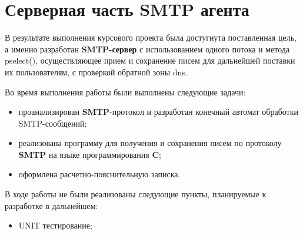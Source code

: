 \documentclass[a4paper,12pt]{report}
\begin{document}
\section{Серверная часть SMTP агента}

В результате выполнения курсового проекта была достугнута поставленная цель, а именно разработан
\textbf{SMTP-сервер} с использованием одного потока и метода pselect(), осуществляющее прием и сохранение писем
для дальнейшей поставки их пользователям, с проверкой обратной зоны dns.

Во время выполнения работы были выполнены следующие задачи:
\begin{itemize}
    \item проанализирован \textbf{SMTP}-протокол и разработан конечный автомат обработки SMTP-сообщений;
    \item реализована программу для получения и сохранения писем по протоколу \textbf{SMTP} на языке программирования \textbf{C};
    \item оформлена расчетно-пояснительную записка.
\end{itemize}
В ходе работы не были реализованы следующие пункты, планируемые к разработке в дальнейшем:
\begin{itemize}
    \item UNIT тестирование;
\end{itemize}
\end{document}
